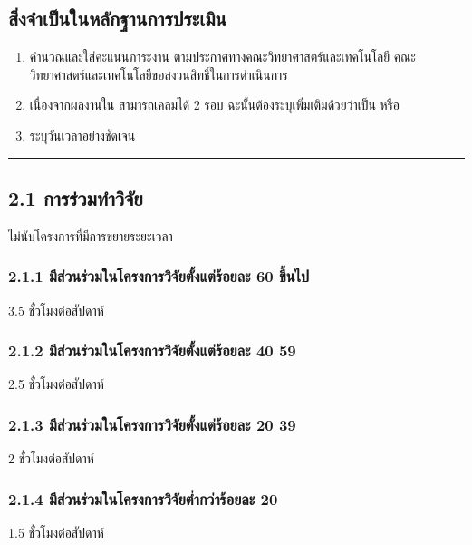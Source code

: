 \documentclass[a4paper,12pt,english]{sphinxmanual}
\begin{document}
\subsection{สิ่งจำเป็นในหลักฐานการประเมิน}
\label{\detokenize{workload_rubric:id24}}\begin{enumerate}
%
\item {} 
 คำนวณและใส่คะแนนภาระงาน ตามประกาศทางคณะวิทยาศาสตร์และเทคโนโลยี คณะวิทยาศาสตร์และเทคโนโลยีขอสงวนสิทธิ์ในการดำเนินการ

\item {} 
เนื่องจากผลงานใน {\hyperref[\detokenize{workload_rubric:id31}]{}} สามารถเคลมได้ 2 รอบ ฉะนั้นต้องระบุเพิ่มเติมด้วยว่าเป็น  หรือ 

\item {} 
ระบุวันเวลาอย่างชัดเจน

\end{enumerate}


\bigskip\hrule\bigskip



\subsection{2.1 การร่วมทำวิจัย}
\label{\detokenize{workload_rubric:id25}}
ไม่นับโครงการที่มีการขยายระยะเวลา


\subsubsection{2.1.1 มีส่วนร่วมในโครงการวิจัยตั้งแต่ร้อยละ 60 ขึ้นไป}
\label{\detokenize{workload_rubric:id26}}
3.5 ชั่วโมงต่อสัปดาห์


\subsubsection{2.1.2 มีส่วนร่วมในโครงการวิจัยตั้งแต่ร้อยละ 40 \sphinxhyphen{} 59}
\label{\detokenize{workload_rubric:id27}}
2.5 ชั่วโมงต่อสัปดาห์


\subsubsection{2.1.3 มีส่วนร่วมในโครงการวิจัยตั้งแต่ร้อยละ 20 \sphinxhyphen{} 39}
\label{\detokenize{workload_rubric:id28}}
2 ชั่วโมงต่อสัปดาห์


\subsubsection{2.1.4 มีส่วนร่วมในโครงการวิจัยต่ำกว่าร้อยละ 20}
\label{\detokenize{workload_rubric:id29}}
1.5 ชั่วโมงต่อสัปดาห์
\end{document}
